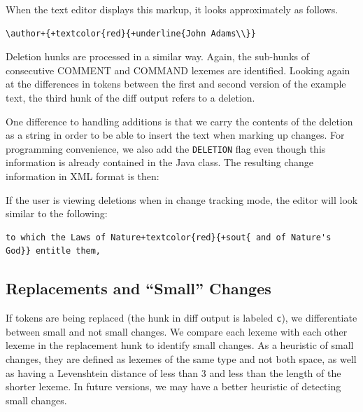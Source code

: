 
When the text editor displays this markup, it looks approximately as follows.

\begin{Verbatim}[frame=lines,label={Markup for first diff block in text editor},samepage=true,showspaces=true,commandchars=+\{\}]
\author+{+textcolor{red}{+underline{John Adams\\}}
\end{Verbatim}

Deletion hunks are processed in a similar way.  Again, the sub-hunks of consecutive COMMENT and COMMAND lexemes are identified.  Looking again at the differences in tokens between the first and second version of the example text, the third hunk of the diff output refers to a deletion.


One difference to handling additions is that we carry the contents of the deletion as a string in order to be able to insert the text when marking up changes.  For programming convenience, we also add the \texttt{DELETION} flag even though this information is already contained in the Java class.  The resulting change information in XML format is then:


If the user is viewing deletions when in change tracking mode, the editor will look similar to the following:

\begin{Verbatim}[frame=lines,label={Markup of deletion block},showspaces=true,commandchars=+\{\}]
to which the Laws of Nature+textcolor{red}{+sout{ and of Nature's God}} entitle them,
\end{Verbatim}

\subsection{Replacements and ``Small'' Changes}

If tokens are being replaced (the hunk in diff output is labeled \texttt{c}), we differentiate between small and not small changes.  We compare each lexeme with each other lexeme in the replacement hunk to identify small changes.  As a heuristic of small changes, they are defined as lexemes of the same type and not both space, as well as having a Levenshtein distance of less than 3 and less than the length of the shorter lexeme. In future versions, we may have a better heuristic of detecting small changes. %

